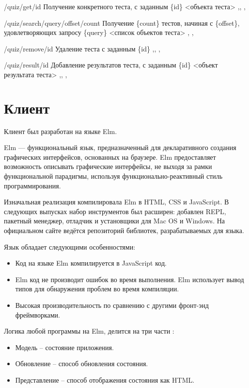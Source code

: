  {/quiz/get/{id}}
{Получение конкретного теста, с заданным \{id\}}
{}
{<объекта теста>}
{ \sep {}\sep {}  \sep {}}

 {/quiz/search/{query}/{offset}/{count}}
{Получение \{count\} тестов, начиная с \{offset\}, удовлетворяющих запросу \{query\}}
{}
{<список объектов теста>}
{ \sep {} \sep {}}

 {/quiz/remove/{id}}
{Удаление теста с заданным \{id\}}
{}
{}
{ \sep {}\sep  {}   \sep {}}

 {/quiz/result/{id}}
{Добавление результатов теста, с заданным \{id\}}
{<объект результата теста>}
{}
{ \sep {}\sep  {}   \sep {}}

\section{Клиент}

Клиент был разработан на языке Elm. 

Elm — функциональный язык, предназначенный для декларативного создания графических интерфейсов, основанных на браузере. Elm предоставляет возможность описывать графические интерфейсы, не выходя за рамки функциональной парадигмы, используя функционально-реактивный стиль программирования.

Изначальная реализация компилировала Elm в HTML, CSS и JavaScript. В следующих выпусках набор инструментов был расширен: добавлен REPL, пакетный менеджер, отладчик и установщики для Mac OS и Windows. На официальном сайте ведётся репозиторий библиотек, разрабатываемых для языка.

Язык обладает следующими особенностями:
\begin{itemize}
	\item Код на языке Elm компилируется в JavaScript код.
	\item Elm код не производит ошибок во время выполнения. Elm использует вывод типов для обнаружения проблем во время компиляции.
	\item Высокая производительность по сравнению с другими фронт-энд фреймворками.
\end{itemize}

Логика любой программы на Elm, делится на три части \cite{elm}:
\begin{itemize}
	\item Модель -- состояние приложения.
	\item Обновление -- способ обновления состояния.
	\item Представление -- способ отображения состояния как HTML.
\end{itemize}

